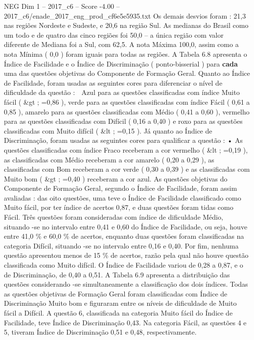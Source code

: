 \begin{textsample}{NEG Dim 1 – 2017\_c6 – Score -4.00 – 2017\_c6/enade\_2017\_eng\_prod\_cf6e5e5935.txt}
Os demais desvios foram : 21,3 nas regiões Nordeste e Sudeste, e 20,6 na região Sul.
As medianas do Brasil como um todo e de quatro das cinco regiões foi 50,0 – a única região com valor diferente de Mediana foi a Sul, com 62,5.
A nota Máxima 100,0, assim como a nota Mínima ( 0,0 ) foram iguais para todas as regiões.
A Tabela 6.8 apresenta o Índice de Facilidade e o Índice de Discriminação ( ponto-bisserial ) para \textbf{cada} uma das questões objetivas do Componente de Formação Geral.
Quanto ao Índice de Facilidade, foram usadas as seguintes cores para diferenciar o nível de dificuldade da questão :  Azul para as questões classificadas com índice Muito fácil ( \&gt ; =0,86 ), verde para as questões classificadas com índice Fácil ( 0,61 a 0,85 ), amarelo para as questões classificadas com Médio ( 0,41 a 0,60 ), vermelho para as questões classificadas com Difícil ( 0,16 a 0,40 ) e roxo para as questões classificadas com Muito difícil ( \&lt ; =0,15 ).
Já quanto ao Índice de Discriminação, foram usadas as seguintes cores para qualificar a questão : • As questões classificadas com índice Fraco receberam a cor vermelho ( \&lt ; =0,19 ), as classificadas com Médio receberam a cor amarelo ( 0,20 a 0,29 ), as classificadas com Bom receberam a cor verde ( 0,30 a 0,39 ) e as classificadas com Muito bom ( \&gt ; =0,40 ) receberam a cor azul.
As questões objetivas do Componente de Formação Geral, segundo o Índice de Facilidade, foram assim avaliadas : das oito questões, uma teve o Índice de Facilidade classificado como Muito fácil, por ter índice de acertos 0,87, e duas questões foram tidas como Fácil.
Três questões foram consideradas com índice de dificuldade Médio, situando -se no intervalo entre 0,41 e 0,60 do Índice de Facilidade, ou seja, houve entre 41,0 \% e 60,0 \% de acertos, enquanto duas questões foram classificadas na categoria Difícil, situando -se no intervalo entre 0,16 e 0,40.
Por fim, nenhuma questão apresentou menos de 15 \% de acertos, razão pela qual não houve questão classificada como Muito difícil.
O Índice de Facilidade variou de 0,28 a 0,87, e o de Discriminação, de 0,40 a 0,51.
A Tabela 6.9 apresenta a distribuição das questões considerando -se simultaneamente a classificação dos dois índices.
Todas as questões objetivas de Formação Geral foram classificadas com Índice de Discriminação Muito bom e figuraram entre os níveis de dificuldade de Muito fácil a Difícil.
A questão 6, classificada na categoria Muito fácil do Índice de Facilidade, teve Índice de Discriminação 0,43.
Na categoria Fácil, as questões 4 e 5, tiveram Índice de Discriminação 0,51 e 0,48, respectivamente.

\end{textsample}

